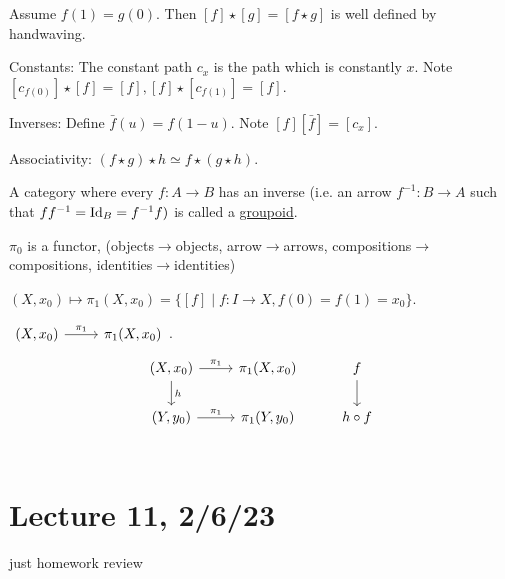 \documentclass[x11names,reqno,14pt]{extarticle}
\begin{document}

Assume $f(1) = g(0)$. Then $[f]\star[g] = [f\star g]$ is well defined by handwaving. 

Constants: The constant path $c_x$ is the path which is constantly $x$. Note $[c_{f(0)}]\star[f] = [f], [f]\star[c_{f(1)}] = [f]$. 

Inverses: Define $\bar{f}(u) = f(1 - u)$. Note $[f][\bar{f}] = [c_x]$. 

Associativity: $(f\star g)\star h \simeq f\star(g\star h)$. 

 A category where every $f:A\to B$ has an inverse (i.e. an arrow $f^{-1}:B\to A$ such that $ff^{-1} = \operatorname{\mathrm{Id}}_B = f^{-1}f)$ is called a \underline{groupoid}. 

$\pi_0$ is a functor, (objects$\to$objects, arrow$\to$arrows, compositions$\to$compositions, identities$\to$identities)

$(X, x_0) \mapsto \pi_1(X, x_0) = \{[f]\mid f:I\to X, f(0) = f(1) = x_0\}$. 

$\begin{tikzcd} (X, x_0)\ar[r, "\pi_1"]&\pi_1(X, x_0) \end{tikzcd}$. 
\[
\begin{tikzcd}
(X, x_0)\ar[d, "h"]\ar[r, "\pi_1"]&\pi_1(X, x_0) & f \ar[d] \\
(Y, y_0) \ar[r, "\pi_1"]&\pi_1(Y, y_0) & h\circ f \\
\end{tikzcd}
\]

\section*{Lecture 11, 2/6/23}

just homework review
\end{document}
